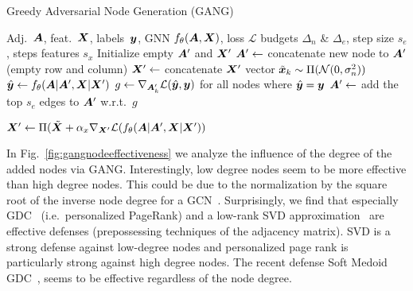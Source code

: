 \documentclass[letterpaper]{article} %
\newcommand{\adj}{\mA}
\newcommand{\features}{\mX}
\begin{document}
\begin{algorithm}[t]
    \small
	\caption{Greedy Adversarial Node Generation (GANG)}
	\label{algo:gang}
	\begin{algorithmic}[1]
         Adj.\ \(\adj\), feat.\ \(\features\), labels\ \({\bm{y}}\), GNN \(f_{\theta}(\adj, \features)\), loss \(\mathcal{L}\)
		 budgets \(\Delta_n\) \& \(\Delta_e\), step size \(s_e\), steps features \(s_x\)
		\STATE Initialize empty \(\adj^\prime\) and \(\features^\prime\)
		\STATE \(\adj^\prime \leftarrow\) concatenate new node to \(\adj^\prime\) (empty row and column)
		\STATE \(\features^\prime \leftarrow\) concatenate \(\features^\prime\) vector \(\tilde{{\bm{x}}}_k \sim \Pi(\mathcal{N}(0, \sigma_n^2))\)
		\STATE \(\hat{\vy} \leftarrow f_{\theta}(\adj | \adj^\prime, \features | \features^\prime)\)
		\STATE \(g \leftarrow \nabla_{\adj^\prime_k} \mathcal{L}(\hat{\vy}, \vy)\) for all nodes where \(\hat{{\bm{y}}} = {\bm{y}}\)
		\STATE \(\adj^\prime \leftarrow\) add the top \(s_e\) edges to \(\adj^\prime\) w.r.t.~\(g\)
		\ENDFOR
						
						
		\STATE \(\features^\prime \leftarrow \Pi(\tilde{\features} + \alpha_x \nabla_{\features^\prime} \mathcal{L}(f_{\theta}(\adj | \adj^\prime, \features | \features^\prime))\)
		\ENDFOR
		\ENDFOR
	\end{algorithmic}
\end{algorithm}

In Fig.~\ref{fig:gangnodeeffectiveness} we analyze the influence of the degree of the added nodes via GANG. Interestingly, low degree nodes seem to be more effective than high degree nodes. This could be due to the normalization by the square root of the inverse node degree for a GCN~\cite{Kipf2017}. Surprisingly, we find that especially GDC~\cite{Klicpera2019a} (i.e.~personalized PageRank) and a low-rank SVD approximation~\cite{Entezari2020} are effective defenses (prepossessing techniques of the adjacency matrix). SVD is a strong defense against low-degree nodes and personalized page rank is particularly strong against high degree nodes. The recent defense Soft Medoid GDC~\citep{Geisler2020}, seems to be effective regardless of the node degree.
\end{document}

